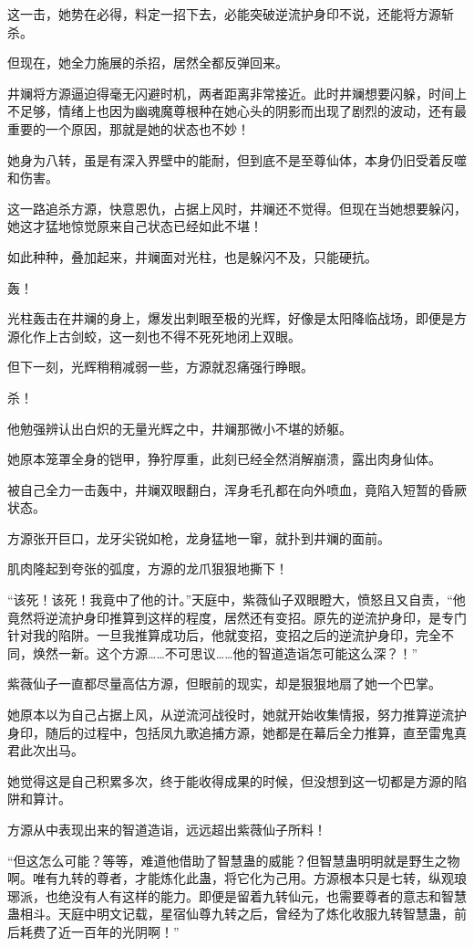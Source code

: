 \begin{this_body}
这一击，她势在必得，料定一招下去，必能突破逆流护身印不说，还能将方源斩杀。

但现在，她全力施展的杀招，居然全都反弹回来。

井斓将方源逼迫得毫无闪避时机，两者距离非常接近。此时井斓想要闪躲，时间上不足够，情绪上也因为幽魂魔尊根种在她心头的阴影而出现了剧烈的波动，还有最重要的一个原因，那就是她的状态也不妙！

她身为八转，虽是有深入界壁中的能耐，但到底不是至尊仙体，本身仍旧受着反噬和伤害。

这一路追杀方源，快意恩仇，占据上风时，井斓还不觉得。但现在当她想要躲闪，她这才猛地惊觉原来自己状态已经如此不堪！

如此种种，叠加起来，井斓面对光柱，也是躲闪不及，只能硬抗。

轰！

光柱轰击在井斓的身上，爆发出刺眼至极的光辉，好像是太阳降临战场，即便是方源化作上古剑蛟，这一刻也不得不死死地闭上双眼。

但下一刻，光辉稍稍减弱一些，方源就忍痛强行睁眼。

杀！

他勉强辨认出白炽的无量光辉之中，井斓那微小不堪的娇躯。

她原本笼罩全身的铠甲，狰狞厚重，此刻已经全然消解崩溃，露出肉身仙体。

被自己全力一击轰中，井斓双眼翻白，浑身毛孔都在向外喷血，竟陷入短暂的昏厥状态。

方源张开巨口，龙牙尖锐如枪，龙身猛地一窜，就扑到井斓的面前。

肌肉隆起到夸张的弧度，方源的龙爪狠狠地撕下！

“该死！该死！我竟中了他的计。”天庭中，紫薇仙子双眼瞪大，愤怒且又自责，“他竟然将逆流护身印推算到这样的程度，居然还有变招。原先的逆流护身印，是专门针对我的陷阱。一旦我推算成功后，他就变招，变招之后的逆流护身印，完全不同，焕然一新。这个方源……不可思议……他的智道造诣怎可能这么深？！”

紫薇仙子一直都尽量高估方源，但眼前的现实，却是狠狠地扇了她一个巴掌。

她原本以为自己占据上风，从逆流河战役时，她就开始收集情报，努力推算逆流护身印，随后的过程中，包括凤九歌追捕方源，她都是在幕后全力推算，直至雷鬼真君此次出马。

她觉得这是自己积累多次，终于能收得成果的时候，但没想到这一切都是方源的陷阱和算计。

方源从中表现出来的智道造诣，远远超出紫薇仙子所料！

“但这怎么可能？等等，难道他借助了智慧蛊的威能？但智慧蛊明明就是野生之物啊。唯有九转的尊者，才能炼化此蛊，将它化为己用。方源根本只是七转，纵观琅琊派，也绝没有人有这样的能力。即便是留着九转仙元，也需要尊者的意志和智慧蛊相斗。天庭中明文记载，星宿仙尊九转之后，曾经为了炼化收服九转智慧蛊，前后耗费了近一百年的光阴啊！”


\end{this_body}
